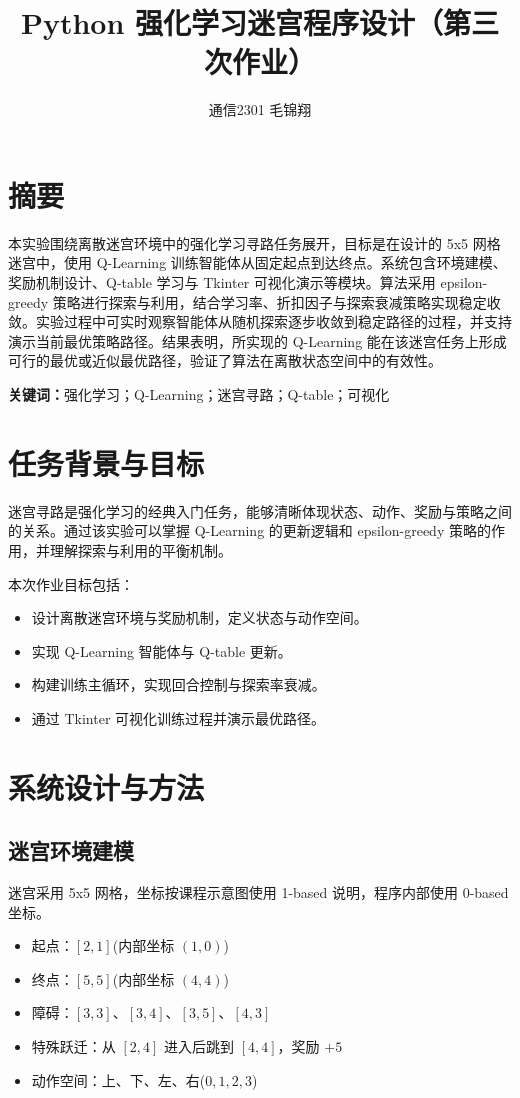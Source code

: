 \documentclass[UTF8, a4paper, 12pt]{ctexart}
\title{Python 强化学习迷宫程序设计（第三次作业）}
\author{通信2301 毛锦翔}
\date{}
\begin{document}
\maketitle

\section*{摘要}

本实验围绕离散迷宫环境中的强化学习寻路任务展开，目标是在设计的 5x5 网格迷宫中，使用 Q-Learning 训练智能体从固定起点到达终点。系统包含环境建模、奖励机制设计、Q-table 学习与 Tkinter 可视化演示等模块。算法采用 epsilon-greedy 策略进行探索与利用，结合学习率、折扣因子与探索衰减策略实现稳定收敛。实验过程中可实时观察智能体从随机探索逐步收敛到稳定路径的过程，并支持演示当前最优策略路径。结果表明，所实现的 Q-Learning 能在该迷宫任务上形成可行的最优或近似最优路径，验证了算法在离散状态空间中的有效性。

\textbf{关键词：}强化学习；Q-Learning；迷宫寻路；Q-table；可视化

\section{任务背景与目标}

迷宫寻路是强化学习的经典入门任务，能够清晰体现状态、动作、奖励与策略之间的关系。通过该实验可以掌握 Q-Learning 的更新逻辑和 epsilon-greedy 策略的作用，并理解探索与利用的平衡机制。

本次作业目标包括：
\begin{itemize}
  \item 设计离散迷宫环境与奖励机制，定义状态与动作空间。
  \item 实现 Q-Learning 智能体与 Q-table 更新。
  \item 构建训练主循环，实现回合控制与探索率衰减。
  \item 通过 Tkinter 可视化训练过程并演示最优路径。
\end{itemize}

\section{系统设计与方法}

\subsection{迷宫环境建模}

迷宫采用 5x5 网格，坐标按课程示意图使用 1-based 说明，程序内部使用 0-based 坐标。
\begin{itemize}
  \item 起点：$[2,1]$(内部坐标 $(1,0)$)
  \item 终点：$[5,5]$(内部坐标 $(4,4)$)
  \item 障碍：$[3,3]$、$[3,4]$、$[3,5]$、$[4,3]$
  \item 特殊跃迁：从 $[2,4]$ 进入后跳到 $[4,4]$，奖励 $+5$
  \item 动作空间：上、下、左、右($0,1,2,3$)
\end{itemize}
\end{document}
